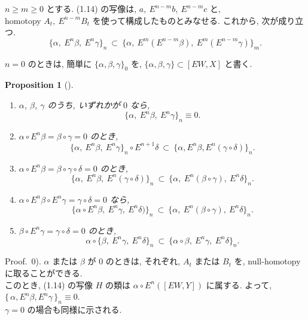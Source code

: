 \documentclass[12pt, leqno]{ltjsarticle}
\newcommand{\Ex}{E}        %
\newcommand{\todai}[2][]{\{\,#2\,\}_{#1}}      %
\numberwithin{equation}{section}
\theoremstyle{plain}
\newtheorem{proposition}[theorem]{Proposition}
\theoremstyle{definition}
\theoremstyle{remark}
\begin{document}
\(n\ge m\ge 0\) とする.
(1.14) の写像は,
\(a,\ E^{n-m}b,\ E^{n-m}c\) と, \\
homotopy \(A_t,\ E^{n-m}B_t\)
を使って構成したものとみなせる.
これから, 次が成り立つ.
\begin{equation}\label{eq:split-m}
\{\alpha,\ \Ex^n\beta,\ \Ex^n\gamma\}_n
\ \subset\
\bigl\{\alpha,\ \Ex^{m}(E^{n-m}\beta),\ E^{m}(E^{n-m}\gamma)\bigr\}_m .
\end{equation}

$n=0$ のときは, 
簡単に $\{\alpha,\beta,\gamma\}_0$ を,
$\{\alpha,\beta,\gamma\} \subset[\Ex W, X]$ と書く. 

\begin{proposition}[]\label{prop:1-2}
\leavevmode
\begin{enumerate}
\item[$0).$] $\alpha$, $\beta$, $\gamma$ のうち, いずれかが $0$ なら,
\[
\{\alpha,\ \Ex^n\beta,\ \Ex^n\gamma\}_n\equiv0.
\]
\item[$i).$] $\alpha\circ \Ex^n\beta=\beta\circ\gamma=0$ のとき,
\[
\{\alpha,\ \Ex^n\beta,\ \Ex^n\gamma\}_n\circ\Ex^{n+1}\delta\ \subset\ \{\alpha,\Ex^n \beta, \Ex^n(\gamma\circ\delta)\}_n.
\]
\item[$ii).$] $\alpha\circ \Ex^n\beta=\beta\circ\gamma\circ\delta=0$ のとき,
\[
\{\alpha,\ \Ex^n\beta,\ \Ex^n(\gamma\circ\delta)\}_n\ \subset\ \{\alpha,\ \Ex^n(\beta\circ\gamma),\ \Ex^n\delta\}_n .
\]
\item[$iii).$] $\alpha\circ\Ex^n\beta\circ\Ex^n\gamma=\gamma\circ\delta=0$ なら,
\[
\{\alpha\circ\Ex^n\beta,\ \Ex^n\gamma,\ \Ex^n\delta)\}_n\ \subset\ \{\alpha,\ \Ex^n(\beta\circ\gamma),\ \Ex^n\delta\}_n .
\]
\item[$iv).$] $\beta\circ\Ex^n\gamma=\gamma\circ\delta=0$ のとき,
\[
\alpha\circ\{\beta,\ \Ex^n\gamma,\ \Ex^n\delta\}_n\ \subset\ \{\alpha\circ\beta,\ \Ex^n\gamma,\ \Ex^n\delta\}_n .
\]
\end{enumerate}
\end{proposition}

Proof.\ 
0). $\alpha$ または $\beta$ が $0$ のときは, 
それぞれ, $A_t$ または $B_t$ を,
null-homotopy に取ることができる. \\
このとき, (1.14) の写像 \(H\) の類は 
\(\alpha\circ E^n([EW,Y])\) に属する.
よって, \(\todai[n]{\alpha, E^n\beta, E^n\gamma}\equiv0\).\\
\(\gamma=0\) の場合も同様に示される.
\end{document}
